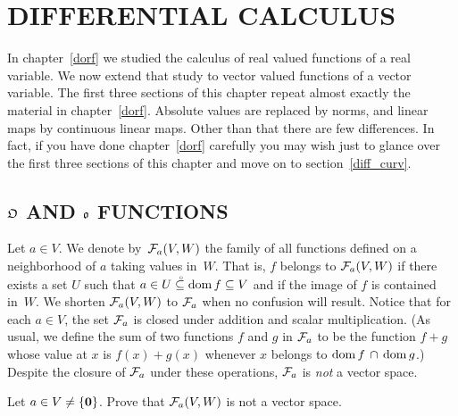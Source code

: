 \chapter{DIFFERENTIAL CALCULUS}\label{diff_calc}

In chapter~\ref{dorf} we studied the calculus of real valued functions of a real variable.  We
now extend that study to vector valued functions of a vector variable.  The first three
sections of this chapter repeat almost exactly the material in chapter~\ref{dorf}.  Absolute
values are replaced by norms, and linear maps by continuous linear maps.  Other than that
there are few differences.  In fact, if you have done chapter~\ref{dorf} carefully you may
wish just to glance over the first three sections of this chapter and move on to
section~\ref{diff_curv}.

\vspace{.2in}

\begin{center}
\end{center}

 \vspace{.2in}

\section{$\mathfrak{O}$ AND $\mathfrak{o}$ FUNCTIONS}

\begin{notn}  Let $a \in V$.  We denote
by~$\mathcal{F}_a(V,W)$ the family of all functions defined on a neighborhood of $a$ taking values
in~$W$.  That is, $f$ belongs to $\mathcal{F}_a(V,W)$ if there exists a set $U$ such that $a \in
U\overset{\thickspace{}_\circ}{\subseteq}\operatorname{dom} f \subseteq V$ and if the image of $f$ is contained in~$W$.  We shorten $\mathcal{F}_a(V,W)$ to $\mathcal{F}_a$ when no confusion will result.  Notice that for each $a \in V$, the
set $\mathcal{F}_a$ is closed under addition and scalar multiplication. (As usual, we define the
sum of two functions $f$ and $g$ in $\mathcal{F}_a$ to be the function $f+g$ whose value at $x$ is
$f(x)+g(x)$ whenever $x$ belongs to $\operatorname{dom} f \,\cap\, \operatorname{dom} g$.)  Despite the closure of $\mathcal{F}_a$ under these operations, $\mathcal{F}_a$ is \emph{not} a vector space.
\end{notn}

\begin{prob}  Let $a \in V \ne \{\mathbf{0}\}$. Prove that $\mathcal{F}_a(V,W)$ is not a vector space.
\end{prob}

